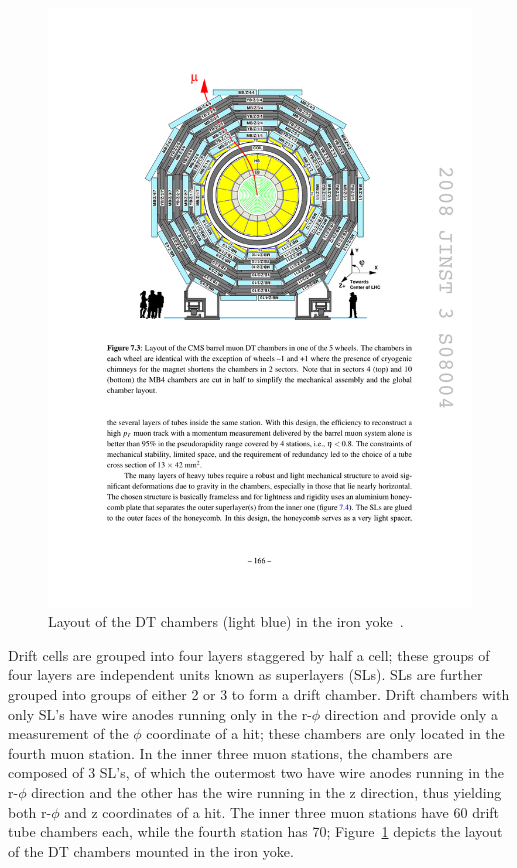 \begin{figure}[hbtp]
  \begin{center}
    \includegraphics[width=1.5\cmsFigWidth]{figures/cms-muon-DTlayout}
    \caption{Layout of the DT chambers (light blue) in the iron yoke~\cite{1748-0221-3-08-S08004}.}
    \label{fig:cms-muon-DTlayout}
  \end{center}
\end{figure}

Drift cells are grouped into four layers staggered by half a cell; these groups of four layers are independent units known as superlayers (SLs). SLs are further grouped into groups of either 2 or 3 to form a drift chamber. Drift chambers with only SL's have wire anodes running only in the r-$\phi$ direction and provide only a measurement of the $\phi$ coordinate of a hit; these chambers are only located in the fourth muon station. In the inner three muon stations, the chambers are composed of 3 SL's, of which the outermost two have wire anodes running in the r-$\phi$ direction and the other has the wire running in the z direction, thus yielding both r-$\phi$ and z coordinates of a hit. The inner three muon stations have 60 drift tube chambers each, while the fourth station has 70; Figure~\ref{fig:cms-muon-DTlayout} depicts the layout of the DT chambers mounted in the iron yoke.

